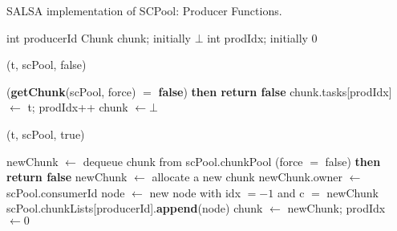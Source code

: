\begin{algo*}[tbh]
\caption{SALSA implementation of SCPool: Producer Functions.}
\label{alg:producer-non-fifo}
\begin{minipage}[t]{0.48\textwidth}
\begin{distribalgo}[1]
\setcounter{ALC@line}{\value{alg:non-fifo:lines}}

	\STATE int producerId
	\STATE Chunk chunk; initially $\bot$  \label{alg:line:chunk}
	\STATE int prodIdx; initially $0$ 
\ENDINDENT

\medskip

	(t, scPool, false)
\ENDINDENT

\medskip

		 ({\bf getChunk}(scPool, force) $=$ {\bf false}) {\bf then return false}
	\ENDINDENT
	\STATE chunk.tasks[prodIdx] $\leftarrow$ t; prodIdx++ \label{alg:line:chunk-insert}
	  \STATE chunk $\leftarrow \bot$ 
	\ENDINDENT
\ENDINDENT

\setcounter{alg:non-fifo:lines}{\value{ALC@line}} %
\end{distribalgo}
\end{minipage}%
%
\hfill
%
\begin{minipage}[t]{0.48\textwidth}
%
\begin{distribalgo}[1]
\setcounter{ALC@line}{\value{alg:non-fifo:lines}}

	(t, scPool, true)
\ENDINDENT

\medskip

	\STATE newChunk $\leftarrow$ dequeue chunk from scPool.chunkPool
	 \label{alg:line:no-chunk-start}
		  (force $=$ false) {\bf then return false} 
		 \STATE newChunk $\leftarrow$ allocate a new chunk \label{alg:line:no-chunk-end}
	\ENDINDENT
	\STATE newChunk.owner $\leftarrow$ scPool.consumerId
	\STATE node $\leftarrow$ new node with idx $=-1$ and c $=$ newChunk
	\STATE scPool.chunkLists[producerId].{\bf append}(node)
	\STATE chunk $\leftarrow$ newChunk; prodIdx $\leftarrow 0$ 
\ENDINDENT

\setcounter{alg:non-fifo:lines}{\value{ALC@line}}
\end{distribalgo}
\end{minipage}
\end{algo*}
